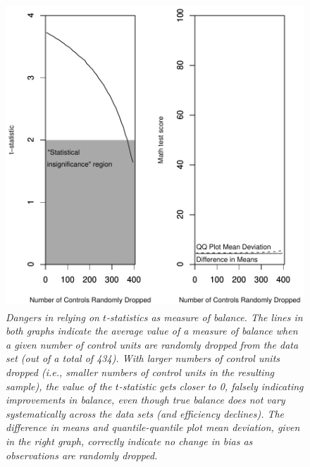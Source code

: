 \documentclass[11pt,titlepage]{article}
\begin{document}
\begin{figure}[t]
  \centering
  \includegraphics[height=4.5in]{figs/TStatPlotR0MATH}
  \caption{\em Dangers in relying on $t$-statistics as measure of balance.
    The lines in both graphs indicate the average value of a measure
    of balance when a given number of control units are randomly
    dropped from the data set (out of a total of 434).  With larger
    numbers of control units dropped (i.e., smaller numbers of control
    units in the resulting sample), the value of the $t$-statistic gets
    closer to 0, falsely indicating improvements in balance, even
    though true balance does not vary systematically across the data
    sets (and efficiency declines).  The difference in means and
    quantile-quantile plot mean deviation, given in the right graph,
    correctly indicate no change in bias as observations are randomly
    dropped.}
  \label{f:randrop}
\end{figure}
\end{document}

